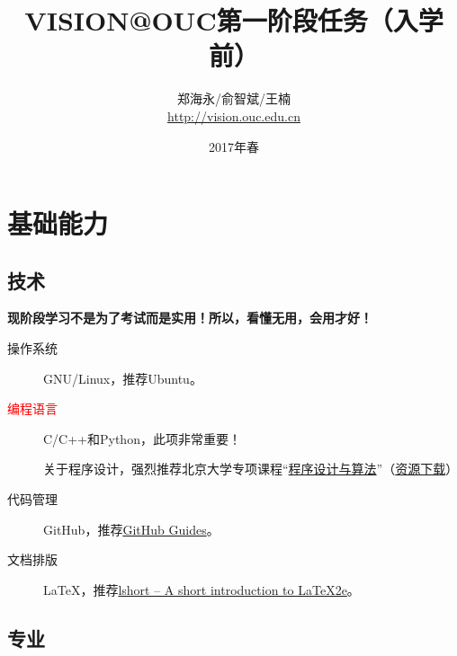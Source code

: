 \documentclass[14pt,a4paper]{extarticle}
\begin{document}
\title{\vspace{-2em}VISION@OUC第一阶段任务（入学前）\vspace{-0.7em}}
\author{郑海永/俞智斌/王楠\\\url{http://vision.ouc.edu.cn}}
\date{\vspace{-0.7em}2017年春\vspace{-0.7em}}
\maketitle\thispagestyle{fancy}
\maketitle
\tableofcontents

\section{基础能力}

\subsection{技术}

\textbf{现阶段学习不是为了考试而是实用！所以，看懂无用，会用才好！}

\begin{description}
\item[操作系统] GNU/Linux，推荐Ubuntu。
\item[\textcolor{red}{编程语言}] C/C++和Python，此项非常重要！

关于程序设计，强烈推荐北京大学专项课程“\href{https://www.coursera.org/specializations/biancheng-suanfa}{程序设计与算法}”（\href{http://vision.ouc.edu.cn/~zhenghaiyong/courses/oop/2017spring/mooc/}{资源下载}）
\item[代码管理] GitHub，推荐\href{https://guides.github.com/}{GitHub Guides}。
\item[文档排版] \LaTeX{}，推荐\href{https://www.ctan.org/tex-archive/info/lshort/}{lshort – A short in­tro­duc­tion to \LaTeX2e{}}。
\end{description}

\subsection{专业}
\end{document}
